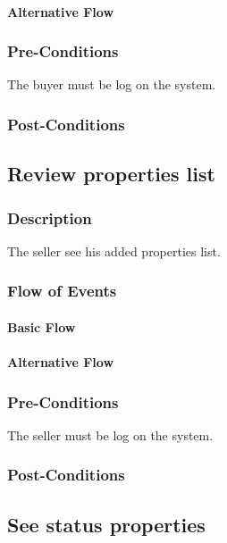 \documentclass[a4paper,12pt]{article}
\begin{document}
\paragraph{Alternative Flow}
\begin{itemize}
\end{itemize}
\subsubsection{Pre-Conditions}
The buyer must be log on the system.
\subsubsection{Post-Conditions}

\subsection{Review properties list}
\subsubsection{Description}
The seller see his added properties list.
\subsubsection{Flow of Events}
\paragraph{Basic Flow}
\begin{itemize}
\end{itemize}
\paragraph{Alternative Flow}
\begin{itemize}
\end{itemize}
\subsubsection{Pre-Conditions}
The seller must be log on the system.
\subsubsection{Post-Conditions}

\subsection{See status properties}
\end{document}
